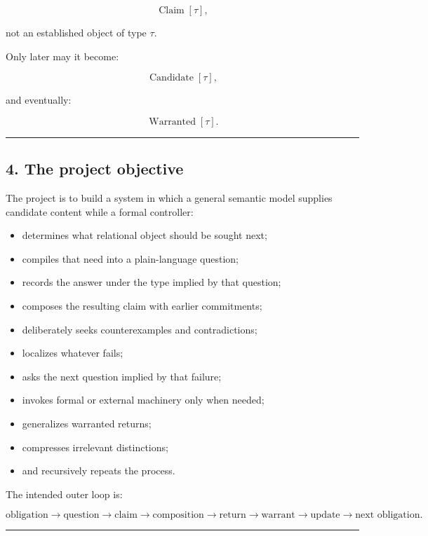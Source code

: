 \documentclass[
]{article}
\providecommand{\tightlist}{%
  \setlength{\itemsep}{0pt}\setlength{\parskip}{0pt}}
\begin{document}
\[
\operatorname{Claim}[\tau],
\]

not an established object of type \(\tau\).

Only later may it become:

\[
\operatorname{Candidate}[\tau],
\]

and eventually:

\[
\operatorname{Warranted}[\tau].
\]

\begin{center}\rule{0.5\linewidth}{0.5pt}\end{center}

\subsection{4. The project objective}\label{the-project-objective}

The project is to build a system in which a general semantic model
supplies candidate content while a formal controller:

\begin{itemize}
\tightlist
\item
  determines what relational object should be sought next;
\item
  compiles that need into a plain-language question;
\item
  records the answer under the type implied by that question;
\item
  composes the resulting claim with earlier commitments;
\item
  deliberately seeks counterexamples and contradictions;
\item
  localizes whatever fails;
\item
  asks the next question implied by that failure;
\item
  invokes formal or external machinery only when needed;
\item
  generalizes warranted returns;
\item
  compresses irrelevant distinctions;
\item
  and recursively repeats the process.
\end{itemize}

The intended outer loop is:

\[
\boxed{
\text{obligation}
\to
\text{question}
\to
\text{claim}
\to
\text{composition}
\to
\text{return}
\to
\text{warrant}
\to
\text{update}
\to
\text{next obligation}.
}
\]

\begin{center}\rule{0.5\linewidth}{0.5pt}\end{center}
\end{document}
